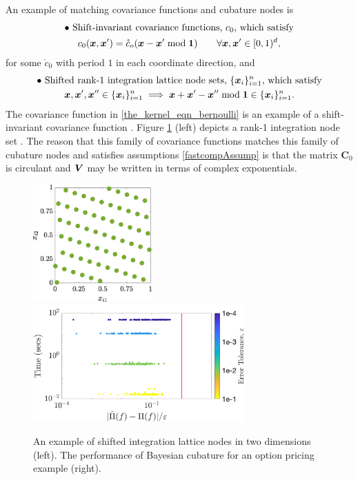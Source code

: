\documentclass[sts]{imsart}
\numberwithin{equation}{section}
\theoremstyle{plain}
\newcommand{\vC}{\boldsymbol{C}}
\begin{document}
An example of matching covariance functions and cubature nodes is 
\begin{multline*}
    \bullet \text{ Shift-invariant covariance functions, $c_0$, which satisfy}  \\ 
    c_0(\vx, \vx') = \mathring{c}_o(\vx - \vx' \bmod \vone) \qquad \forall \vx, \vx' \in [0,1)^d,
\end{multline*}
for some $\mathring{c}_0$ with period $1$ in each coordinate direction, and
\begin{multline*}
    \bullet \text{ Shifted rank-1 integration lattice node sets, $\{\vx_i\}_{i=1}^n$, which satisfy} \\
    \vx, \vx' , \vx'' \in \{\vx_i\}_{i=1}^n \implies \vx + \vx' - \vx'' \bmod \vone \in \{\vx_i\}_{i=1}^n. 
\end{multline*}
The covariance function in \eqref{the_kernel_eqn_bernoulli} is an example of a shift-invariant covariance function \citep{Hic98b}.  Figure \ref{fig:latfig} (left) depicts a rank-1 integration node set \cite{SloJoe94,DicEtal14a}.  The reason that this family of covariance functions matches this family of cubature nodes and satisfies assumptions \eqref{fastcompAssump} is that the matrix $\vC_0$ is circulant and $\boldsymbol{V}$ may be written in terms of complex exponentials.
\begin{figure}
    \centering
    \includegraphics[height = 4.5cm]{ShiftedLatticePoints.eps} \qquad	
    \includegraphics[height = 4.5cm]{"optPrice_guaranteed_time_full_Baker_d12_r1_2018-Sep-6"}
    \caption{An example of shifted integration lattice nodes in two dimensions (left). The performance of Bayesian cubature for an option pricing example (right).}
    \label{fig:latfig}
\end{figure}
\end{document}
